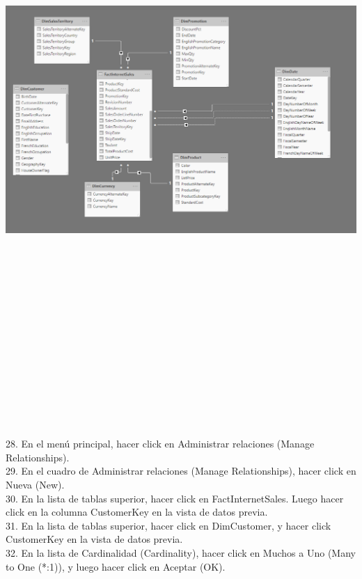 \begin{flushleft}
\begin{itemize}
\begin{center}
	\includegraphics[width=20cm]{./Imagenes/img8} 
	\end{center}
\textbf{ }\\
\textbf{ }\\
\textbf{ }\\
\textbf{ }\\
\textbf{ }\\
\textbf{ }\\
\textbf{ }\\
\textbf{ }\\
\textbf{ }\\
\textbf{ }\\
\textbf{ }\\
\textbf{ }\\
\textbf{ }\\
\textbf{ }\\
28. En el menú principal, hacer click en Administrar relaciones (Manage Relationships).\\
29. En el cuadro de Administrar relaciones (Manage Relationships), hacer click en Nueva (New).\\
30. En la lista de tablas superior, hacer click en FactInternetSales. Luego hacer click en la columna
CustomerKey en la vista de datos previa.\\
31. En la lista de tablas superior, hacer click en DimCustomer, y hacer click CustomerKey en la vista de datos
previa.\\
32. En la lista de Cardinalidad (Cardinality), hacer click en Muchos a Uno (Many to One (*:1)), y luego hacer
click en Aceptar (OK).\\
\textbf{ }\\


\end{itemize}
\end{flushleft}
